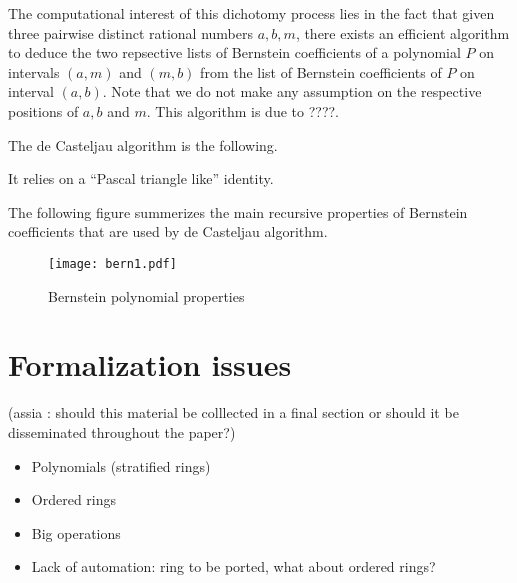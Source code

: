 \documentclass{article}
\begin{document}
 The
computational interest of this dichotomy process lies in the fact that
given three pairwise distinct rational numbers $a, b, m$, there exists an
efficient algorithm to deduce the two repsective lists of Bernstein
coefficients of a polynomial $P$ on intervals $(a, m)$ and $(m, b)$
from the list of Bernstein coefficients of $P$ on interval $(a,
b)$. Note that we do not make any assumption on the respective
positions of $a, b$ and $m$. This algorithm is due to ????.

The de Casteljau algorithm is the following.

It relies on a ``Pascal triangle like'' identity.


The following figure summerizes the main recursive properties of
Bernstein coefficients that are used by de Casteljau algorithm.
\begin{figure}\label{bern}
\begin{center}
\texttt{[image: bern1.pdf]}
\end{center}
\caption{Bernstein polynomial properties}
\end{figure}



\section{Formalization issues}

(assia : should this material be colllected in a final section or
should it be disseminated throughout the paper?)

\begin{itemize}
\item Polynomials (stratified rings)
\item Ordered rings
\item Big operations
\item Lack of automation: ring to be ported, what about ordered rings?
\end{itemize}
\end{document}
